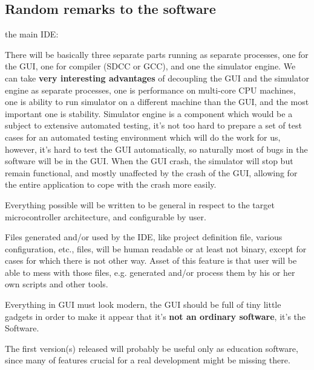\documentclass[a4paper,twoside,15pt]{book}
\begin{document}
        \subsection{Random remarks to the software}
            \begin{dinglist}{73}
                \item the main IDE:
                    \begin{dinglist}{75}
                        \item There will be basically three separate parts running as separate processes, one for the GUI, one for compiler (SDCC or GCC), and one the simulator engine. We can take \textbf{very interesting advantages} of decoupling the GUI and the simulator engine as separate processes, one is performance on multi-core CPU machines, one is ability to run simulator on a different machine than the GUI, and the most important one is stability. Simulator engine is a component which would be a subject to extensive automated testing, it's not too hard to prepare a set of test cases for an automated testing environment which will do the work for us, however, it's hard to test the GUI automatically, so naturally most of bugs in the software will be in the GUI. When the GUI crash, the simulator will stop but remain functional, and mostly unaffected by the crash of the GUI, allowing for the entire application to cope with the crash more easily.
                        \item Everything possible will be written to be general in respect to the target microcontroller architecture, and configurable by user.
                        \item Files generated and/or used by the IDE, like project definition file, various configuration, etc., files, will be human readable or at least not binary, except for cases for which there is not other way. Asset of this feature is that user will be able to mess with those files, e.g. generated and/or process them by his or her own scripts and other tools.
                        \item Everything in GUI must look modern, the GUI should be full of tiny little gadgets in order to make it appear that it's \textbf{not an ordinary software}, it's the Software.
                        \item The first version(s) released will probably be useful only as education software, since many of features crucial for a real development might be missing there.
                    \end{dinglist}

\end{dinglist}
\end{document}
